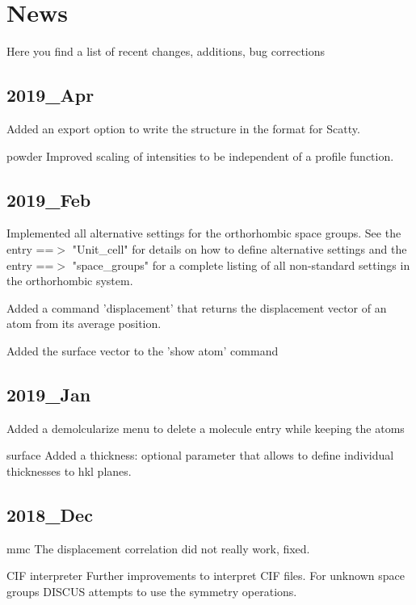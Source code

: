 \section{News}
\par
Here you find a list of recent changes, additions, bug corrections 
\subsection*{2019\_Apr}
\par
Added an export option to write the structure in the format for 
Scatty. 
\par
powder 
   Improved scaling of intensities to be independent of a 
   profile function. 
\subsection*{2019\_Feb}
\par
Implemented all alternative settings for the orthorhombic space 
groups. See the entry ==$> $ "Unit\_cell" for details on how to 
define alternative settings and the entry ==$> $ "space\_groups" for 
a complete listing of all non-standard settings in the 
orthorhombic system. 
\par
Added a command 'displacement' that returns the displacement 
vector of an atom from its average position. 
\par
Added the surface vector to the 'show atom' command 
\subsection*{2019\_Jan}
\par
Added a demolcularize menu to delete a molecule entry while 
keeping the atoms 
\par
surface 
   Added a thickness: optional parameter that allows to define 
   individual thicknesses to hkl planes. 
\subsection*{2018\_Dec}
\par
mmc 
   The displacement correlation did not really work, fixed. 
\par
CIF interpreter 
   Further improvements to interpret CIF files. For unknown 
   space groups DISCUS attempts to use the symmetry operations. 
